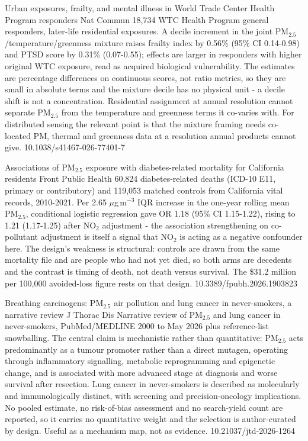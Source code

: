 \documentclass[10pt]{article}
\begin{document}
{Urban exposures, frailty, and mental illness in World Trade Center Health Program responders}
{Nat Commun}
{18,734 WTC Health Program general responders, later-life residential exposures. A decile increment in the joint PM$_{2.5}$/temperature/greenness mixture raises frailty index by 0.56\% (95\% CI 0.14-0.98) and PTSD score by 0.31\% (0.07-0.55); effects are larger in responders with higher original WTC exposure, read as acquired biological vulnerability. The estimates are percentage differences on continuous scores, not ratio metrics, so they are small in absolute terms and the mixture decile has no physical unit - a decile shift is not a concentration. Residential assignment at annual resolution cannot separate PM$_{2.5}$ from the temperature and greenness terms it co-varies with. For distributed sensing the relevant point is that the mixture framing needs co-located PM, thermal and greenness data at a resolution annual products cannot give.}
{10.1038/s41467-026-77401-7}


{Associations of PM$_{2.5}$ exposure with diabetes-related mortality for California residents}
{Front Public Health}
{60,824 diabetes-related deaths (ICD-10 E11, primary or contributory) and 119,053 matched controls from California vital records, 2010-2021. Per 2.65 $\mu$g\,m$^{-3}$ IQR increase in the one-year rolling mean PM$_{2.5}$, conditional logistic regression gave OR 1.18 (95\% CI 1.15-1.22), rising to 1.21 (1.17-1.25) after NO$_2$ adjustment - the association strengthening on co-pollutant adjustment is itself a signal that NO$_2$ is acting as a negative confounder here. The design's weakness is structural: controls are drawn from the same mortality file and are people who had not yet died, so both arms are decedents and the contrast is timing of death, not death versus survival. The \$31.2 million per 100,000 avoided-loss figure rests on that design.}
{10.3389/fpubh.2026.1903823}


{Breathing carcinogens: PM$_{2.5}$ air pollution and lung cancer in never-smokers, a narrative review}
{J Thorac Dis}
{Narrative review of PM$_{2.5}$ and lung cancer in never-smokers, PubMed/MEDLINE 2000 to May 2026 plus reference-list snowballing. The central claim is mechanistic rather than quantitative: PM$_{2.5}$ acts predominantly as a tumour promoter rather than a direct mutagen, operating through inflammatory signalling, metabolic reprogramming and epigenetic change, and is associated with more advanced stage at diagnosis and worse survival after resection. Lung cancer in never-smokers is described as molecularly and immunologically distinct, with screening and precision-oncology implications. No pooled estimate, no risk-of-bias assessment and no search-yield count are reported, so it carries no quantitative weight and the selection is author-curated by design. Useful as a mechanism map, not as evidence.}
{10.21037/jtd-2026-1264}
\end{document}
